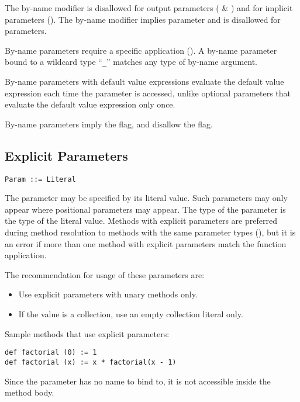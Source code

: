 The by-name modifier is disallowed for output parameters ( \& ) and for implicit parameters (). The by-name modifier implies  parameter and is disallowed for  parameters. 

By-name parameters require a specific application (). A by-name parameter bound to a wildcard type ``\lstinline!_!'' matches any type of by-name argument. 

By-name parameters with default value expressions evaluate the default value expression each time the parameter is accessed, unlike optional parameters that evaluate the default value expression only once. 

By-name parameters imply the  flag, and disallow the  flag. 

\subsection{Explicit Parameters}
\label{sec:explicit-parameters}

\syntax\begin{lstlisting}
Param ::= Literal
\end{lstlisting}

The parameter may be specified by its literal value. Such parameters may only appear where positional parameters may appear. The type of the parameter is the type of the literal value. Methods with explicit parameters are preferred during method resolution to methods with the same parameter types (), but it is an error if more than one method with explicit parameters match the function application. 

The recommendation for usage of these parameters are: 
\begin{itemize}
\item Use explicit parameters with unary methods only. 
\item If the value is a collection, use an empty collection literal only. 
\end{itemize}

\example Sample methods that use explicit parameters:
\begin{lstlisting}
def factorial (0) := 1
def factorial (x) := x * factorial(x - 1)
\end{lstlisting}

Since the parameter has no name to bind to, it is not accessible inside the method body. 

